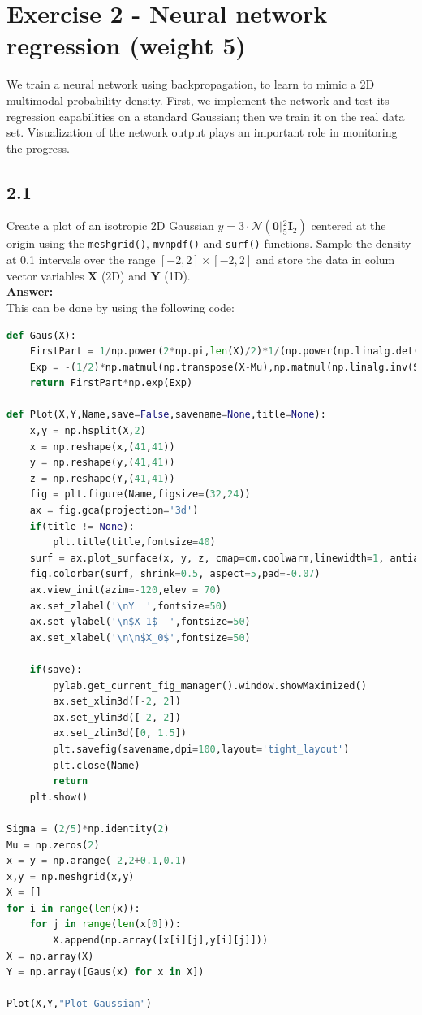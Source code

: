 \documentclass[a4paper]{article}
\begin{document}
\section*{Exercise 2 - Neural network regression (weight 5)}

We train a neural network using backpropagation, to learn to mimic a 2D multimodal probability density. First, we implement the network and test its regression capabilities on a standard Gaussian; then we train it on the real data set. Visualization of the network output plays an important role in monitoring the progress.

\subsection*{2.1}

Create a plot of an isotropic 2D Gaussian $y = 3 \cdot \mathcal{N}(\textbf{0}|\frac{2}{5}\textbf{I}_2)$ centered at the origin using the \texttt{meshgrid()}, \texttt{mvnpdf()} and \texttt{surf()} functions. Sample the density at 0.1 intervals over the range $[-2,2] \times [-2,2]$ and store the data in colum vector variables $\textbf{X}$ (2D) and $\textbf{Y}$ (1D).\\

\textbf{Answer:}\\


This can be done by using the following code:

\begin{lstlisting}[language=Python]
def Gaus(X):
    FirstPart = 1/np.power(2*np.pi,len(X)/2)*1/(np.power(np.linalg.det(Sigma),0.5))
    Exp = -(1/2)*np.matmul(np.transpose(X-Mu),np.matmul(np.linalg.inv(Sigma),X-Mu))
    return FirstPart*np.exp(Exp)

def Plot(X,Y,Name,save=False,savename=None,title=None):
    x,y = np.hsplit(X,2)
    x = np.reshape(x,(41,41))
    y = np.reshape(y,(41,41))
    z = np.reshape(Y,(41,41))
    fig = plt.figure(Name,figsize=(32,24))
    ax = fig.gca(projection='3d')
    if(title != None):
        plt.title(title,fontsize=40)
    surf = ax.plot_surface(x, y, z, cmap=cm.coolwarm,linewidth=1, antialiased=True)
    fig.colorbar(surf, shrink=0.5, aspect=5,pad=-0.07)
    ax.view_init(azim=-120,elev = 70)
    ax.set_zlabel('\nY  ',fontsize=50)
    ax.set_ylabel('\n$X_1$  ',fontsize=50)
    ax.set_xlabel('\n\n$X_0$',fontsize=50)
    
    if(save):
        pylab.get_current_fig_manager().window.showMaximized()
        ax.set_xlim3d([-2, 2])
        ax.set_ylim3d([-2, 2])
        ax.set_zlim3d([0, 1.5])
        plt.savefig(savename,dpi=100,layout='tight_layout')
        plt.close(Name)
        return
    plt.show()

Sigma = (2/5)*np.identity(2)
Mu = np.zeros(2)
x = y = np.arange(-2,2+0.1,0.1)
x,y = np.meshgrid(x,y)
X = []
for i in range(len(x)):
    for j in range(len(x[0])):
        X.append(np.array([x[i][j],y[i][j]]))
X = np.array(X)
Y = np.array([Gaus(x) for x in X])

Plot(X,Y,"Plot Gaussian")
\end{lstlisting}
\end{document}
